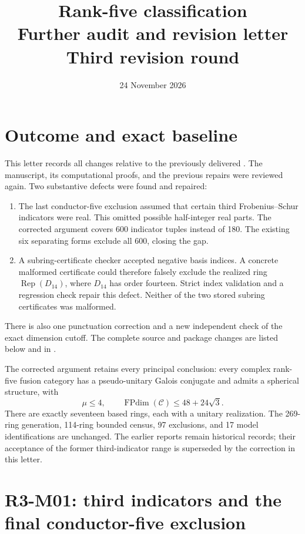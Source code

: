 \documentclass[11pt,a4paper]{article}
\title{Rank-five classification\\[4pt]\large Further audit and revision letter\\Third revision round}
\author{}
\date{24 November 2026}
\newcommand{\FPdim}{\operatorname{FPdim}}
\begin{document}
\maketitle

\section{Outcome and exact baseline}

This letter records all changes relative to the previously delivered
. The manuscript, its
computational proofs, and the previous repairs were reviewed again.
Two substantive defects were found and repaired:
\begin{enumerate}
\item The last conductor-five exclusion assumed that certain third
Frobenius--Schur indicators were real. This omitted possible
half-integer real parts. The corrected argument covers 600 indicator
tuples instead of 180. The existing six separating forms exclude all
600, closing the gap.
\item A subring-certificate checker accepted negative basis indices.
A concrete malformed certificate could therefore falsely exclude the
realized ring $\operatorname{Rep}(D_{14})$, where $D_{14}$ has order
fourteen. Strict index validation and a regression check repair this
defect. Neither of the two stored subring certificates was malformed.
\end{enumerate}
There is also one punctuation correction and a new independent check
of the exact dimension cutoff. The complete source and package changes
are listed below and in .

The corrected argument retains every principal conclusion: every
complex rank-five fusion category has a pseudo-unitary Galois conjugate
and admits a spherical structure, with
\[
\mu\le4,\qquad \FPdim(\mathcal C)\le48+24\sqrt3.
\]
There are exactly seventeen based rings, each with a unitary realization.
The 269-ring generation, 114-ring bounded census, 97 exclusions, and
17 model identifications are unchanged. The earlier reports remain
historical records; their acceptance of the former third-indicator
range is superseded by the correction in this letter.

\section{R3-M01: third indicators and the final conductor-five exclusion}
\end{document}
